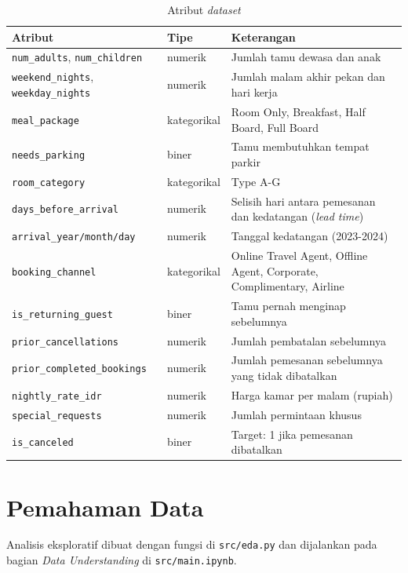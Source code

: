 \begin{table}[H]
	\centering
	\caption{Atribut \textit{dataset}}
	\label{tab:atribut}
	\small
	\begin{tabular}{l l p{6cm}}
		\toprule
		\textbf{Atribut} & \textbf{Tipe} & \textbf{Keterangan} \\
		\midrule
		\texttt{num\_adults}, \texttt{num\_children} & numerik & Jumlah tamu dewasa dan anak \\
		\texttt{weekend\_nights}, \texttt{weekday\_nights} & numerik & Jumlah malam akhir pekan dan hari kerja \\
		\texttt{meal\_package} & kategorikal & Room Only, Breakfast, Half Board, Full Board \\
		\texttt{needs\_parking} & biner & Tamu membutuhkan tempat parkir \\
		\texttt{room\_category} & kategorikal & Type A-G \\
		\texttt{days\_before\_arrival} & numerik & Selisih hari antara pemesanan dan kedatangan (\textit{lead time}) \\
		\texttt{arrival\_year/month/day} & numerik & Tanggal kedatangan (2023-2024) \\
		\texttt{booking\_channel} & kategorikal & Online Travel Agent, Offline Agent, Corporate, Complimentary, Airline \\
		\texttt{is\_returning\_guest} & biner & Tamu pernah menginap sebelumnya \\
		\texttt{prior\_cancellations} & numerik & Jumlah pembatalan sebelumnya \\
		\texttt{prior\_completed\_bookings} & numerik & Jumlah pemesanan sebelumnya yang tidak dibatalkan \\
		\texttt{nightly\_rate\_idr} & numerik & Harga kamar per malam (rupiah) \\
		\texttt{special\_requests} & numerik & Jumlah permintaan khusus \\
		\midrule
		\texttt{is\_canceled} & biner & Target: 1 jika pemesanan dibatalkan \\
		\bottomrule
	\end{tabular}
\end{table}

\section{Pemahaman Data}

Analisis eksploratif dibuat dengan fungsi di \texttt{src/eda.py} dan dijalankan
pada bagian \textit{Data Understanding} di \texttt{src/main.ipynb}.

